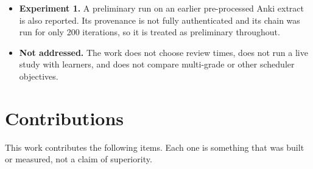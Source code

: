\begin{itemize}
    $\sqrt{1+n_{\text{right}}}$, $\sqrt{1+n_{\text{wrong}}}$ and a bias term. No lexeme features are
    used.
  \item \textbf{Experiment 1.} A preliminary run on an earlier pre-processed Anki extract is also
    reported. Its provenance is not fully authenticated and its chain was run for only 200
    iterations, so it is treated as preliminary throughout.
  \item \textbf{Not addressed.} The work does not choose review times, does not run a live study
    with learners, and does not compare multi-grade or other scheduler objectives.
\end{itemize}

\section{Contributions}
\label{sec:intro-contributions}

This work contributes the following items. Each one is something that was built or measured,
not a claim of superiority.

